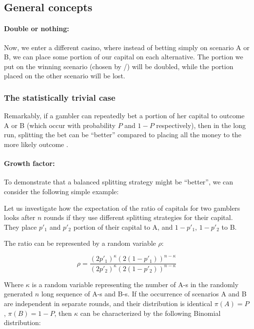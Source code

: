 \documentclass{article}
\theoremstyle{definition}
\begin{document}
\subsection{General concepts}

\paragraph{Double or nothing:}

Now, we enter a different casino, where instead of betting simply on scenario A or B, we can place some portion of our capital on each alternative. The portion we put on the winning scenario (chosen by \PII/) will be doubled, while the portion placed on the other scenario will be lost.

\subsubsection{The statistically trivial case}

\label{subsection:BettingGame}

Remarkably, if a gambler can repeatedly bet a portion of her capital to outcome A or B (which occur with probability $P$ and $1-P$ respectively), then in the long run, splitting the bet can be ``better'' compared to placing all the money to the more likely outcome \cite{Kelly}.

\paragraph{Growth factor:}

To demonstrate that a balanced splitting strategy might be ``better'', we can consider the following simple example: 

Let us investigate how the expectation of the ratio of capitals for two gamblers looks after $n$ rounds if they use different splitting strategies for their capital. They place $p'_1$ and $p'_2$ portion of their capital to A, and $1-p'_1$, $1-p'_2$ to B.

The ratio can be represented by a random variable $\rho$:

\begin{equation}
    \rho = \frac{(2 p'_1)^\kappa (2 (1-p'_1))^{n-\kappa}}{(2 p'_2)^\kappa (2 (1-p'_2))^{n-\kappa}}
\end{equation}

Where $\kappa$ is a random variable representing the number of A-s in the randomly generated $n$ long sequence of A-s and B-s. If the occurrence of scenarios A and B are independent in separate rounds, and their distribution is identical $\pi(A) = P$, $\pi(B) = 1-P$, then $\kappa$ can be characterized by the following Binomial distribution:
\end{document}
